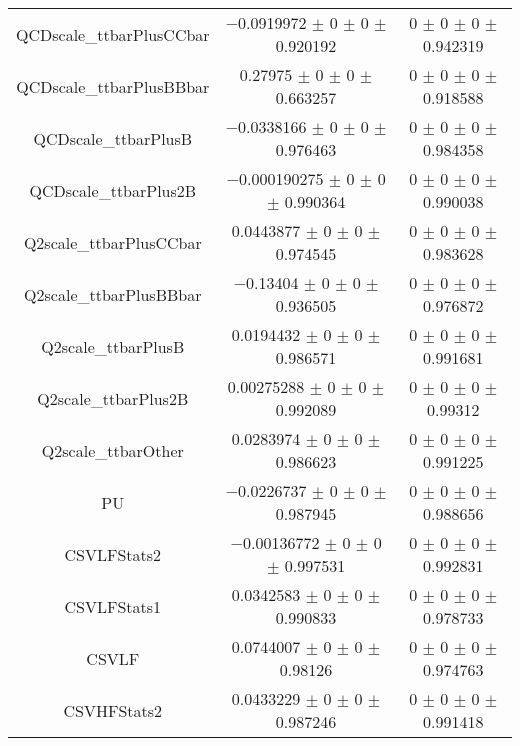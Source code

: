 \begin{table}
\begin{tabular}{ccc}
QCDscale\_ttbarPlusCCbar 	& \num{-0.0919972} $\pm$ \num{0} $\pm$ \num{0} $\pm$ \num{0.920192} 	& \num{0} $\pm$ \num{0} $\pm$ \num{0} $\pm$ \num{0.942319}\\
QCDscale\_ttbarPlusBBbar 	& \num{0.27975} $\pm$ \num{0} $\pm$ \num{0} $\pm$ \num{0.663257} 	& \num{0} $\pm$ \num{0} $\pm$ \num{0} $\pm$ \num{0.918588}\\
QCDscale\_ttbarPlusB 	& \num{-0.0338166} $\pm$ \num{0} $\pm$ \num{0} $\pm$ \num{0.976463} 	& \num{0} $\pm$ \num{0} $\pm$ \num{0} $\pm$ \num{0.984358}\\
QCDscale\_ttbarPlus2B 	& \num{-0.000190275} $\pm$ \num{0} $\pm$ \num{0} $\pm$ \num{0.990364} 	& \num{0} $\pm$ \num{0} $\pm$ \num{0} $\pm$ \num{0.990038}\\
Q2scale\_ttbarPlusCCbar 	& \num{0.0443877} $\pm$ \num{0} $\pm$ \num{0} $\pm$ \num{0.974545} 	& \num{0} $\pm$ \num{0} $\pm$ \num{0} $\pm$ \num{0.983628}\\
Q2scale\_ttbarPlusBBbar 	& \num{-0.13404} $\pm$ \num{0} $\pm$ \num{0} $\pm$ \num{0.936505} 	& \num{0} $\pm$ \num{0} $\pm$ \num{0} $\pm$ \num{0.976872}\\
Q2scale\_ttbarPlusB 	& \num{0.0194432} $\pm$ \num{0} $\pm$ \num{0} $\pm$ \num{0.986571} 	& \num{0} $\pm$ \num{0} $\pm$ \num{0} $\pm$ \num{0.991681}\\
Q2scale\_ttbarPlus2B 	& \num{0.00275288} $\pm$ \num{0} $\pm$ \num{0} $\pm$ \num{0.992089} 	& \num{0} $\pm$ \num{0} $\pm$ \num{0} $\pm$ \num{0.99312}\\
Q2scale\_ttbarOther 	& \num{0.0283974} $\pm$ \num{0} $\pm$ \num{0} $\pm$ \num{0.986623} 	& \num{0} $\pm$ \num{0} $\pm$ \num{0} $\pm$ \num{0.991225}\\
PU 	& \num{-0.0226737} $\pm$ \num{0} $\pm$ \num{0} $\pm$ \num{0.987945} 	& \num{0} $\pm$ \num{0} $\pm$ \num{0} $\pm$ \num{0.988656}\\
CSVLFStats2 	& \num{-0.00136772} $\pm$ \num{0} $\pm$ \num{0} $\pm$ \num{0.997531} 	& \num{0} $\pm$ \num{0} $\pm$ \num{0} $\pm$ \num{0.992831}\\
CSVLFStats1 	& \num{0.0342583} $\pm$ \num{0} $\pm$ \num{0} $\pm$ \num{0.990833} 	& \num{0} $\pm$ \num{0} $\pm$ \num{0} $\pm$ \num{0.978733}\\
CSVLF 	& \num{0.0744007} $\pm$ \num{0} $\pm$ \num{0} $\pm$ \num{0.98126} 	& \num{0} $\pm$ \num{0} $\pm$ \num{0} $\pm$ \num{0.974763}\\
CSVHFStats2 	& \num{0.0433229} $\pm$ \num{0} $\pm$ \num{0} $\pm$ \num{0.987246} 	& \num{0} $\pm$ \num{0} $\pm$ \num{0} $\pm$ \num{0.991418}\\

\end{tabular}
\end{table}
